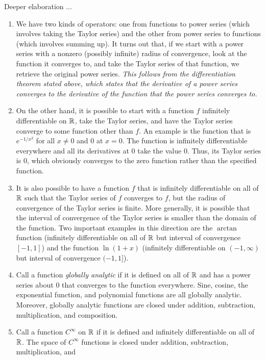 \documentclass[10pt]{amsart}
\begin{document}
Deeper elaboration ...

\begin{enumerate}
\item We have two kinds of operators: one from functions to power
  series (which involves taking the Taylor series) and the other from
  power series to functions (which involves summing up). It turns out
  that, if we start with a power series with a nonzero (possibly
  infinite) radius of convergence, look at the function it converges
  to, and take the Taylor series of that function, we retrieve the
  original power series. {\em This follows from the differentiation
  theorem stated above, which states that the derivative of a power
  series converges to the derivative of the function that the power
  series converges to.}
\item On the other hand, it is possible to start with a function $f$
  infinitely differentiable on $\mathbb{R}$, take the Taylor series, and have
  the Taylor series converge to some function other than $f$. An
  example is the function that is $e^{-1/x^2}$ for all $x \ne 0$ and
  $0$ at $x = 0$. The function is infinitely differentiable everywhere
  and all its derivatives at $0$ take the value $0$. Thus, its Taylor
  series is $0$, which obviously converges to the zero function rather
  than the specified function.
\item It is also possible to have a function $f$ that is infinitely
  differentiable on all of $\mathbb{R}$ such that the Taylor series of $f$
  converges to $f$, but the radius of convergence of the Taylor series
  is finite. More generally, it is possible that the interval of
  convergence of the Taylor series is smaller than the domain of the
  function. Two important examples in this direction are the $\arctan$
  function (infinitely differentiable on all of $\mathbb{R}$ but interval of
  convergence $[-1,1]$) and the function $\ln(1 + x)$ (infinitely
  differentiable on $(-1,\infty)$ but interval of convergence $(-1,1]$).
\item Call a function {\em globally analytic} if it is defined on all
  of $\mathbb{R}$ and has a power series about $0$ that converges to the
  function everywhere. Sine, cosine, the exponential function, and
  polynomial functions are all globally analytic. Moreover, globally
  analytic functions are closed under addition, subtraction,
  multiplication, and composition.
\item Call a function $C^\infty$ on $\mathbb{R}$ if it is defined and
  infinitely differentiable on all of $\mathbb{R}$. The space of $C^\infty$
  functions is closed under addition, subtraction, multiplication, and

\end{enumerate}
\end{document}
